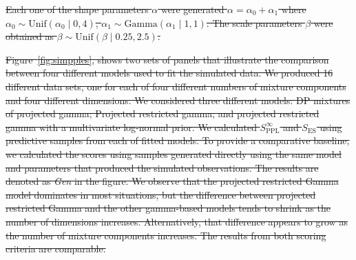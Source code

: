 \documentclass[iicol,sn-basic]{sn-jnl}
\theoremstyle{thmstyleone}
\begin{document}
\st{Each one of the shape parameters $\alpha$ were generated $\alpha = \alpha_0 + \alpha_1$ where $\alpha_0 \sim \text{Unif}(\alpha_0\mid 0,4)$, $\alpha_1\sim \text{Gamma}(\alpha_1\mid 1,1)$.  The scale parameters $\beta$ were obtained as $\beta\sim\text{Unif}(\beta\mid 0.25, 2.5)$.}

\st{Figure~\mbox{\ref{fig:simpples}}, shows two sets of panels that illustrate the comparison between four different models used to fit the simulated data. We produced 16 different data sets, one for each of four different numbers of mixture components and four different dimensions. We considered three different models: DP mixtures of projected gamma; Projected restricted gamma; and projected restricted gamma with a multivariate log-normal prior. We calculated $S^\infty_{\text{PPL}}$ and $S_{\text{ES}}$ using predictive samples from each of fitted models. To provide a comparative baseline, we calculated the scores using samples generated directly using the same model and parameters that produced the simulated observations. The results are denoted as \emph{Gen} in the figure. We observe that the projected restricted Gamma model dominates in most situations, but the difference between projected restricted Gamma and the other gamma-based models tends to shrink as the number of dimensions increases. Alternatively, that difference appears to grow as the number of mixture components increases. The results from both scoring criteria are comparable.}
\end{document}
